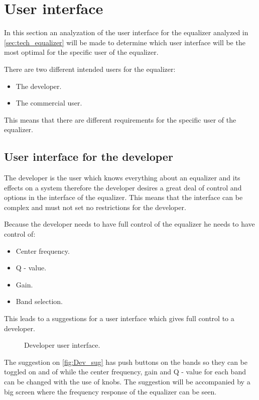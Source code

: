 \section{User interface} \label{sec:user_interface}
In this section an analyzation of the user interface for the equalizer analyzed in \autoref{sec:tech_equalizer} will be made to determine which user interface will be the most optimal for the specific user of the equalizer. 

There are two different intended users for the equalizer: 
\begin{itemize}
\item The developer.
\item The commercial user.
\end{itemize}
This means that there are different requirements for the specific user of the equalizer.

\subsection{User interface for the developer}
The developer is the user which knows everything about an equalizer and its effects on a system therefore the developer desires a great deal of control and options in the interface of the equalizer. This means that the interface can be complex and must not set no restrictions for the developer.  

Because the developer needs to have full control of the equalizer he needs to have control of: 
\begin{itemize}
\item Center frequency.
\item Q - value.
\item Gain.
\item Band selection.
\end{itemize} 
This leads to a suggestions for a user interface which gives full control to a developer.

\begin{figure}[H]
\centering
{}

\caption{Developer user interface.}
\label{fig:Dev_sug}
\end{figure}

The suggestion on \autoref{fig:Dev_sug} has push buttons on the bands so they can be toggled on and of while the center frequency, gain and Q - value for each band can be changed with the use of knobs. The suggestion will be accompanied by a big screen where the frequency response of the equalizer can be seen. 

